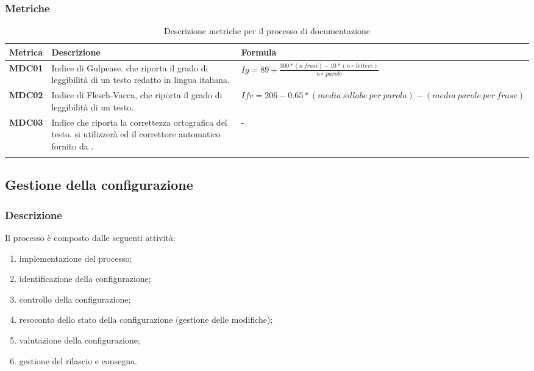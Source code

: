 {{\subsubsection{Metriche}

{
	\setlength{\freewidth}{\dimexpr\textwidth-0\tabcolsep}
	\renewcommand{\arraystretch}{1.5}
	\setlength{\aboverulesep}{0pt}
	\setlength{\belowrulesep}{0pt}
	\begin{longtable}{L{.1\freewidth} L{.45\freewidth}  L{.35\freewidth}}
		\textbf{Metrica} & \textbf{Descrizione } & \textbf{Formula}\\
		\toprule
		\endhead		
		\textbf{MDC01} & Indice di Gulpease. che riporta il grado di leggibilità di un testo redatto in lingua italiana. & \small{$Ig= 89 + \frac{300 * (n\ frasi) - 10 * (n\circ\ lettere)}{n\circ\ parole}$} \\
		\textbf{MDC02} &  Indice di Flesch-Vacca, che riporta il grado di leggibilità di un testo. & \small{$Ifv = 206-0.65 * (media\ sillabe\ per\ parola) - (media\ parole\ per\ frase)$}\\
		\textbf{MDC03} & Indice che riporta la correttezza ortografica del testo. si utilizzerà  ed il correttore automatico fornito da . & - \\
		
		\bottomrule
		\hiderowcolors
		\caption{Descrizione metriche per il processo di documentazione}\\
	\end{longtable}
}

\subsection{Gestione della configurazione}
\subsubsection{Descrizione}
Il processo è composto dalle seguenti attività:
\begin{enumerate}
	\item implementazione del processo;
	\item identificazione della configurazione;
	\item controllo della configurazione;
	\item resoconto dello stato della configurazione (gestione delle modifiche);
	\item valutazione della configurazione;
	\item gestione del rilascio e consegna.
\end{enumerate}

}}
